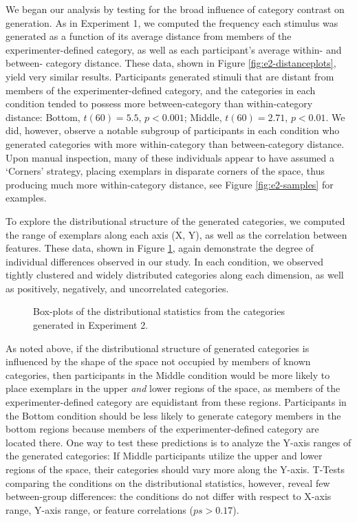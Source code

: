 \documentclass[12pt]{article}
\newcommand\inputpgf[2]{{
\let\pgfimageWithoutPath\pgfimage
\renewcommand{\pgfimage}[2][]{\pgfimageWithoutPath[##1]{#1/##2}}

}}
\begin{document}
\begin{flushleft}
We began our analysis by testing for the broad influence of category contrast on
generation. As in Experiment 1, we computed the frequency each stimulus was
generated as a function of its average distance from members of the
experimenter-defined category, as well as each participant's average within- and
between- category distance. These data, shown in Figure
\ref{fig:e2-distanceplots}, yield very similar results. Participants generated
stimuli that are distant from members of the experimenter-defined category, and
the categories in each condition tended to possess more between-category than
within-category distance: Bottom, $t(60) = 5.5$, $p < 0.001$; Middle, $t(60) =
2.71$, $p < 0.01$. We did, however, observe a notable subgroup of participants
in each condition who generated categories with more within-category than
between-category distance. Upon manual inspection, many of these individuals
appear to have assumed a `Corners' strategy, placing exemplars in disparate
corners of the space, thus producing much more within-category distance, see
Figure \ref{fig:e2-samples} for examples.

To explore the distributional structure of the generated categories, we computed
the range of exemplars along each axis (X, Y), as well as the correlation
between features. These data, shown in Figure \ref{fig:e2-statsboxes}, again
demonstrate the degree of individual differences observed in our study. In each
condition, we observed tightly clustered and widely distributed categories along
each dimension, as well as positively, negatively, and uncorrelated categories.

\begin{figure}
    \begin{center} \inputpgf{figs/}{e2-statsboxes.pgf}
    \caption{Box-plots of the distributional statistics from the categories
generated in Experiment 2. }
    \label{fig:e2-statsboxes}
    \end{center}
\end{figure}


As noted above, if the distributional structure of generated categories is
influenced by the shape of the space not occupied by members of known
categories, then participants in the Middle condition would be more likely to
place exemplars in the upper {\em and} lower regions of the space, as members of
the experimenter-defined category are equidistant from these regions.
Participants in the Bottom condition should be less likely to generate category
members in the bottom regions because members of the experimenter-defined
category are located there. One way to test these predictions is to analyze the
Y-axis ranges of the generated categories: If Middle participants utilize the
upper and lower regions of the space, their categories should vary more along
the Y-axis. T-Tests comparing the conditions on the distributional statistics,
however, reveal few between-group differences: the conditions do not differ with
respect to X-axis range, Y-axis range, or feature correlations ($ps>0.17$).


\end{flushleft}
\end{document}

